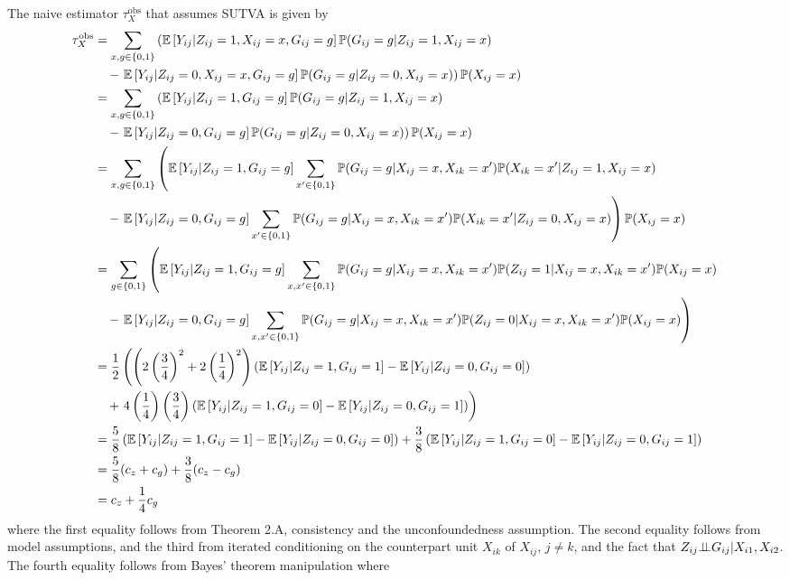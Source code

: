 \documentclass[10pt]{article}
\begin{document}
The naive estimator $\tau_{X}^\text{obs}$ that assumes SUTVA is given by
\begin{align*}
\tau_{X}^\text{obs} &= \sum_{x,g\in\{0,1\}}\left(\mathbb{E}\left[Y_{ij}|Z_{ij}=1,X_{ij}=x,G_{ij}=g\right]\mathbb{P}(G_{ij}=g|Z_{ij}=1,X_{ij}=x)\right. \\
&\quad - \left.\mathbb{E}\left[Y_{ij}|Z_{ij}=0,X_{ij}=x,G_{ij}=g\right]\mathbb{P}(G_{ij}=g|Z_{ij}=0,X_{ij}=x)\right)\mathbb{P}(X_{ij}=x) \\
&= \sum_{x,g\in\{0,1\}}\left(\mathbb{E}\left[Y_{ij}|Z_{ij}=1,G_{ij}=g\right]\mathbb{P}(G_{ij}=g|Z_{ij}=1,X_{ij}=x)\right. \\
&\quad - \left.\mathbb{E}\left[Y_{ij}|Z_{ij}=0,G_{ij}=g\right]\mathbb{P}(G_{ij}=g|Z_{ij}=0,X_{ij}=x)\right)\mathbb{P}(X_{ij}=x) \\
&= \sum_{x,g\in\{0,1\}}\left(\mathbb{E}\left[Y_{ij}|Z_{ij}=1,G_{ij}=g\right]\sum_{x'\in\{0,1\}}\mathbb{P}(G_{ij}=g|X_{ij}=x,X_{ik}=x')\mathbb{P}(X_{ik}=x'|Z_{ij}=1,X_{ij}=x)\right. \\
&\quad - \left.\mathbb{E}\left[Y_{ij}|Z_{ij}=0,G_{ij}=g\right]\sum_{x'\in\{0,1\}}\mathbb{P}(G_{ij}=g|X_{ij}=x,X_{ik}=x')\mathbb{P}(X_{ik}=x'|Z_{ij}=0,X_{ij}=x)\right)\mathbb{P}(X_{ij}=x) \\
&= \sum_{g\in\{0,1\}}\left(\mathbb{E}\left[Y_{ij}|Z_{ij}=1,G_{ij}=g\right]\sum_{x,x'\in\{0,1\}}\mathbb{P}(G_{ij}=g|X_{ij}=x,X_{ik}=x')\mathbb{P}(Z_{ij}=1|X_{ij}=x,X_{ik}=x')\mathbb{P}(X_{ij}=x)\right. \\
&\quad - \left.\mathbb{E}\left[Y_{ij}|Z_{ij}=0,G_{ij}=g\right]\sum_{x,x'\in\{0,1\}}\mathbb{P}(G_{ij}=g|X_{ij}=x,X_{ik}=x')\mathbb{P}(Z_{ij}=0|X_{ij}=x,X_{ik}=x')\mathbb{P}(X_{ij}=x)\right) \\
&= \frac{1}{2}\left(\left(2\left(\frac{3}{4}\right)^2+2\left(\frac{1}{4}\right)^2\right)\left(\mathbb{E}\left[Y_{ij}|Z_{ij}=1,G_{ij}=1\right]-\mathbb{E}\left[Y_{ij}|Z_{ij}=0,G_{ij}=0\right]\right)\right. \\
&\quad + \left.4\left(\frac{1}{4}\right)\left(\frac{3}{4}\right)\left(\mathbb{E}\left[Y_{ij}|Z_{ij}=1,G_{ij}=0\right]-\mathbb{E}\left[Y_{ij}|Z_{ij}=0,G_{ij}=1\right]\right)\right) \\
&= \frac{5}{8}\left(\mathbb{E}\left[Y_{ij}|Z_{ij}=1,G_{ij}=1\right]-\mathbb{E}\left[Y_{ij}|Z_{ij}=0,G_{ij}=0\right]\right) + \frac{3}{8}\left(\mathbb{E}\left[Y_{ij}|Z_{ij}=1,G_{ij}=0\right]-\mathbb{E}\left[Y_{ij}|Z_{ij}=0,G_{ij}=1\right]\right) \\
&= \frac{5}{8}(c_z+c_g) + \frac{3}{8}(c_z-c_g) \\
&= c_z + \frac{1}{4}c_g
\end{align*}
where the first equality follows from Theorem 2.A, consistency and the unconfoundedness assumption. The second equality follows from model assumptions, and the third from iterated conditioning on the counterpart unit $X_{ik}$ of $X_{ij}$, $j\neq k$, and the fact that $Z_{ij}{\perp\!\!\!\perp} G_{ij}|X_{i1},X_{i2}$. The fourth equality follows from Bayes' theorem manipulation where
\end{document}
